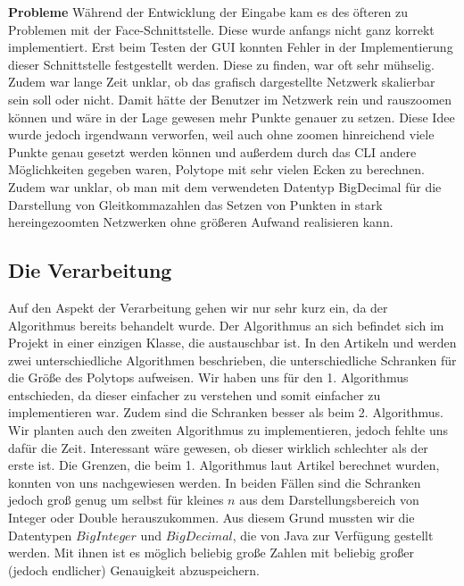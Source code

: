 \textbf{Probleme} Während der Entwicklung der Eingabe kam es des öfteren zu Problemen mit der Face-Schnittstelle. Diese wurde anfangs nicht ganz korrekt implementiert. Erst beim Testen der GUI konnten Fehler in der Implementierung dieser Schnittstelle festgestellt werden. Diese zu finden, war oft sehr mühselig. Zudem war lange Zeit unklar, ob das grafisch dargestellte Netzwerk skalierbar sein soll oder nicht. Damit hätte der Benutzer im Netzwerk rein und rauszoomen können und wäre in der Lage gewesen mehr Punkte genauer zu setzen. Diese Idee wurde jedoch irgendwann verworfen, weil auch ohne zoomen hinreichend viele Punkte genau gesetzt werden können und außerdem durch das CLI andere Möglichkeiten gegeben waren, Polytope mit sehr vielen Ecken zu berechnen. Zudem war unklar, ob man mit dem verwendeten Datentyp BigDecimal für die Darstellung von Gleitkommazahlen das Setzen von Punkten in stark hereingezoomten Netzwerken ohne größeren Aufwand realisieren kann.

\subsection*{Die Verarbeitung}
Auf den Aspekt der Verarbeitung gehen wir nur sehr kurz ein, da der Algorithmus bereits behandelt wurde. Der Algorithmus an sich befindet sich im Projekt in einer einzigen Klasse, die austauschbar ist. In den Artikeln \cite{stackedPoly1} und \cite{stackedPoly2} werden zwei unterschiedliche Algorithmen beschrieben, die unterschiedliche Schranken für die Größe des Polytops aufweisen. Wir haben uns für den 1. Algorithmus entschieden, da dieser einfacher zu verstehen und somit einfacher zu implementieren war. Zudem sind die Schranken besser als beim 2. Algorithmus. Wir planten auch den zweiten Algorithmus zu implementieren, jedoch fehlte uns dafür die Zeit. Interessant wäre gewesen, ob dieser wirklich schlechter als der erste ist. Die Grenzen, die beim 1. Algorithmus laut Artikel berechnet wurden, konnten von uns nachgewiesen werden. In beiden Fällen sind die Schranken jedoch groß genug um selbst für kleines $n$ aus dem Darstellungsbereich von Integer oder Double herauszukommen. Aus diesem Grund mussten wir die Datentypen $BigInteger$ und $BigDecimal$, die von Java zur Verfügung gestellt werden. Mit ihnen ist es möglich beliebig große Zahlen mit beliebig großer (jedoch endlicher) Genauigkeit abzuspeichern.


